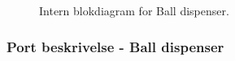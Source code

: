 \documentclass[Arkitektur/System_main.tex]{subfiles}
\begin{document}
\begin{figure}[H]
    \centering
    \caption{Intern blokdiagram for Ball dispenser.}
    \label{fig:balldispensere_hardware_ibd}
\end{figure}

\subsubsection{Port beskrivelse - Ball dispenser}
\end{document}
